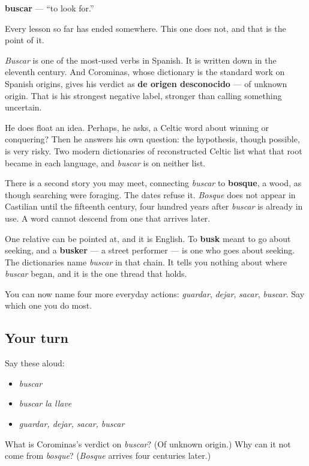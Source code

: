 \begin{cousinweb}
\textbf{buscar} — \textquotedblleft{}to look for.\textquotedblright{}

Every lesson so far has ended somewhere. This one does not, and that is the point of it.

\emph{Buscar} is one of the most-used verbs in Spanish. It is written down in the eleventh century. And Corominas, whose dictionary is the standard work on Spanish origins, gives his verdict as \textbf{de origen desconocido} — of unknown origin. That is his strongest negative label, stronger than calling something uncertain.

He does float an idea. Perhaps, he asks, a Celtic word about winning or conquering? Then he answers his own question: the hypothesis, though possible, is very risky. Two modern dictionaries of reconstructed Celtic list what that root became in each language, and \emph{buscar} is on neither list.

There is a second story you may meet, connecting \emph{buscar} to \textbf{bosque}, a wood, as though searching were foraging. The dates refuse it. \emph{Bosque} does not appear in Castilian until the fifteenth century, four hundred years after \emph{buscar} is already in use. A word cannot descend from one that arrives later.

One relative can be pointed at, and it is English. To \textbf{busk} meant to go about seeking, and a \textbf{busker} — a street performer — is one who goes about seeking. The dictionaries name \emph{buscar} in that chain. It tells you nothing about where \emph{buscar} began, and it is the one thread that holds.
\end{cousinweb}

\begin{grammarlens}[title={What you've built}]
You can now name four more everyday actions: \emph{guardar}, \emph{dejar}, \emph{sacar}, \emph{buscar}. Say which one you do most.
\end{grammarlens}

\subsection*{Your turn}
Say these aloud:

\begin{itemize}
\raggedright
  \item \emph{buscar}
  \item \emph{buscar la llave}
  \item \emph{guardar, dejar, sacar, buscar}
\end{itemize}

\begin{tcolorbox}[breakable,colback=teal!4,colframe=teal!35!black,title={Before you move on}]
What is Corominas's verdict on \emph{buscar}? (Of unknown origin.) Why can it not come from \emph{bosque}? (\emph{Bosque} arrives four centuries later.)
\end{tcolorbox}

